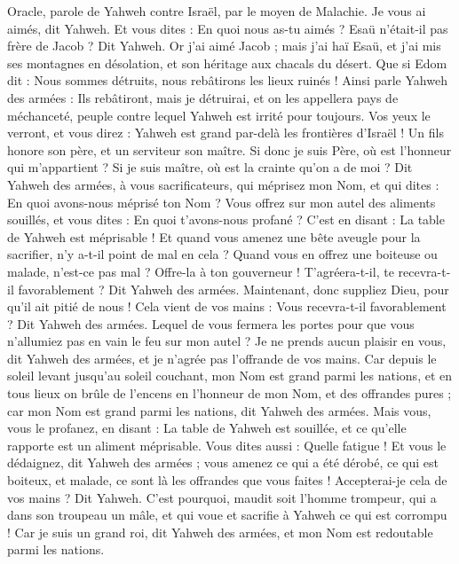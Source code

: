 \begin{multicols}{2}
\VerseOne{}Oracle, parole de Yahweh contre Israël, par le moyen de Malachie.
Je vous ai aimés, dit Yahweh. Et vous dites : En quoi nous as-tu aimés ? Esaü n'était-il pas frère de Jacob ? Dit Yahweh. Or j'ai aimé Jacob ;
mais j'ai haï Esaü, et j'ai mis ses montagnes en désolation, et son héritage aux chacals du désert.
Que si Edom dit : Nous sommes détruits, nous rebâtirons les lieux ruinés ! Ainsi parle Yahweh des armées : Ils rebâtiront, mais je détruirai, et on les appellera pays de méchanceté, peuple contre lequel Yahweh est irrité pour toujours.
Vos yeux le verront, et vous direz : Yahweh est grand par-delà les frontières d'Israël !
Un fils honore son père, et un serviteur son maître. Si donc je suis Père, où est l'honneur qui m'appartient ? Si je suis maître, où est la crainte qu'on a de moi ? Dit Yahweh des armées, à vous sacrificateurs, qui méprisez mon Nom, et qui dites : En quoi avons-nous méprisé ton Nom ?
Vous offrez sur mon autel des aliments souillés, et vous dites : En quoi t'avons-nous profané ? C'est en disant : La table de Yahweh est méprisable !
Et quand vous amenez une bête aveugle pour la sacrifier, n'y a-t-il point de mal en cela ? Quand vous en offrez une boiteuse ou malade, n'est-ce pas mal ? Offre-la à ton gouverneur ! T'agréera-t-il, te recevra-t-il favorablement ? Dit Yahweh des armées.
Maintenant, donc suppliez Dieu, pour qu'il ait pitié de nous ! Cela vient de vos mains : Vous recevra-t-il favorablement ? Dit Yahweh des armées.
Lequel de vous fermera les portes pour que vous n'allumiez pas en vain le feu sur mon autel ? Je ne prends aucun plaisir en vous, dit Yahweh des armées, et je n'agrée pas l'offrande de vos mains.
Car depuis le soleil levant jusqu'au soleil couchant, mon Nom est grand parmi les nations, et en tous lieux on brûle de l'encens en l'honneur de mon Nom, et des offrandes pures ; car mon Nom est grand parmi les nations, dit Yahweh des armées.
Mais vous, vous le profanez, en disant : La table de Yahweh est souillée, et ce qu'elle rapporte est un aliment méprisable.
Vous dites aussi : Quelle fatigue ! Et vous le dédaignez, dit Yahweh des armées ; vous amenez ce qui a été dérobé, ce qui est boiteux, et malade, ce sont là les offrandes que vous faites ! Accepterai-je cela de vos mains ? Dit Yahweh.
C'est pourquoi, maudit soit l'homme trompeur, qui a dans son troupeau un mâle, et qui voue et sacrifie à Yahweh ce qui est corrompu ! Car je suis un grand roi, dit Yahweh des armées, et mon Nom est redoutable parmi les nations.

\end{multicols}
